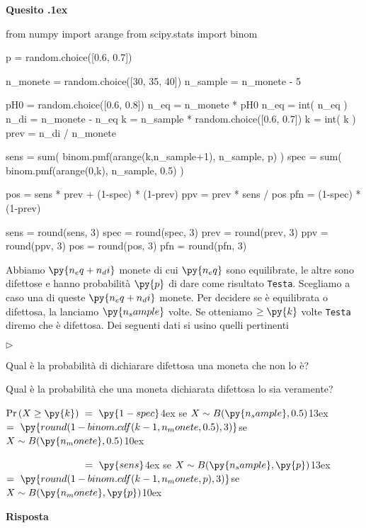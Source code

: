 \documentclass[11pt,twoside,a4paper]{article}
\newcommand{\mylabel}[1]{#1\hfill}
\renewenvironment{itemize}
  {\begin{list}{$\triangleright$}{%
   \setlength{\parskip}{0mm}
   \setlength{\topsep}{.4\baselineskip}
   \setlength{\rightmargin}{0mm}
   \setlength{\listparindent}{0mm}
   \setlength{\itemindent}{0mm}
   \setlength{\labelwidth}{2ex}
   \setlength{\itemsep}{.4\baselineskip}
   \setlength{\parsep}{0mm}
   \setlength{\partopsep}{0mm}
   \setlength{\labelsep}{1ex}
   \setlength{\leftmargin}{\labelwidth+\labelsep}
   \let\makelabel\mylabel}}{%
   \end{list}\vspace*{-1.3mm}}
\newcounter{quesito}
\newenvironment{question}{\addtocounter{quesito}{1}\par\textbf{Quesito \thequesito.\kern1ex}}{\vspace{0.5\parskip}}
\newenvironment{answer}{\par\textbf{Risposta\quad}}{\vspace{\parskip}}
\begin{document}
\begin{question}
\def\Pr{{\rm Pr\,}}
\begin{pycode}
from numpy import arange
from scipy.stats import binom

p = random.choice([0.6, 0.7])

n_monete = random.choice([30, 35, 40])
n_sample = n_monete - 5

pH0 = random.choice([0.6, 0.8])
n_eq = n_monete * pH0
n_eq = int( n_eq )
n_di = n_monete - n_eq
k = n_sample * random.choice([0.6, 0.7])
k = int( k )
prev = n_di / n_monete


sens = sum( binom.pmf(arange(k,n_sample+1), n_sample, p) )
spec = sum( binom.pmf(arange(0,k), n_sample, 0.5) )

pos =  sens * prev + (1-spec) * (1-prev)
ppv =  prev * sens  / pos
pfn =  (1-spec) * (1-prev) 

sens = round(sens, 3)
spec = round(spec, 3)
prev = round(prev, 3)
ppv = round(ppv, 3)
pos = round(pos, 3)
pfn = round(pfn, 3)
\end{pycode}
Abbiamo $\py{n_eq+n_di}$ monete di cui $\py{n_eq}$ sono equilibrate, le altre sono difettose e hanno probabilità $\py{p}$ di dare come risultato {\tt Testa}. Scegliamo a caso una di queste $\py{n_eq+n_di}$ monete. Per decidere se è equilibrata o difettosa, la lanciamo $\py{n_sample}$ volte. Se otteniamo $\ge\py{k}$ volte {\tt Testa\/} diremo che è difettosa. Dei seguenti dati si usino quelli pertinenti

\begin{itemize}
\item[1.] Qual è la probabilità di dichiarare difettosa una moneta che non lo è? 

\item[2.] Qual è la probabilità che una moneta dichiarata difettosa lo sia veramente?
\end{itemize}


$\Pr(X\ge \py{k})\ =\ \py{1-spec}$\kern4ex se $X\sim B(\py{n_sample},0.5)$\kern13ex%
$=\ \py{round(1-binom.cdf(k-1, n_monete,0.5), 3)}$\hfill se $X\sim B(\py{n_monete},0.5)$\kern10ex

$\phantom{\Pr(X\ge \py{k})}\ =\ \py{sens}$\kern4ex se $X\sim B(\py{n_sample},\py{p})$\kern13ex%
$=\ \py{round(1-binom.cdf(k-1, n_monete,  p), 3)}$\hfill se $X\sim B(\py{n_monete},\py{p})$\kern10ex






\begin{answer}


\end{answer}
\end{question}
\end{document}
